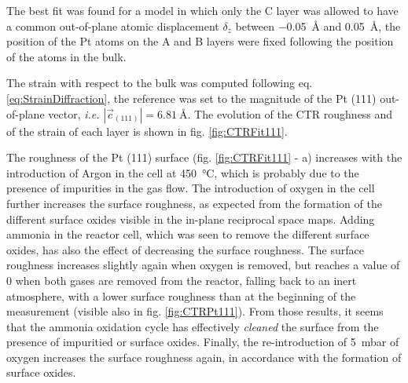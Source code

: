 The best fit was found for a model in which only the C layer was allowed to have a common out-of-plane atomic displacement $\delta_z$ between \qty{-0.05}{\angstrom} and \qty{0.05}{\angstrom}, the position of the Pt atoms on the A and B layers were fixed following the position of the atoms in the bulk.

The strain with respect to the bulk was computed following eq. \ref{eq:StrainDiffraction}, the reference was set to the magnitude of the Pt (111) out-of-plane vector, \textit{i.e.} $|\vec{c}_{(111)}| = \qty{6.81}{\angstrom}$.
The evolution of the CTR roughness and of the strain of each layer is shown in fig. \ref{fig:CTRFit111}.

The roughness of the Pt (111) surface (fig. \ref{fig:CTRFit111} - a) increases with the introduction of Argon in the cell at \qty{450}{\degreeCelsius}, which is probably due to the presence of impurities in the gas flow.
The introduction of oxygen in the cell further increases the surface roughness, as expected from the formation of the different surface oxides visible in the in-plane reciprocal space maps.
Adding ammonia in the reactor cell, which was seen to remove the different surface oxides, has also the effect of decreasing the surface roughness.
The surface roughness increases slightly again when oxygen is removed, but reaches a value of 0 when both gases are removed from the reactor, falling back to an inert atmosphere, with a lower surface roughness than at the beginning of the measurement (visible also in fig. \ref{fig:CTRPt111}).
From those results, it seems that the ammonia oxidation cycle has effectively \textit{cleaned} the surface from the presence of impuritied or surface oxides.
Finally, the re-introduction of \qty{5}{\milli\bar} of oxygen increases the surface roughness again, in accordance with the formation of surface oxides.

